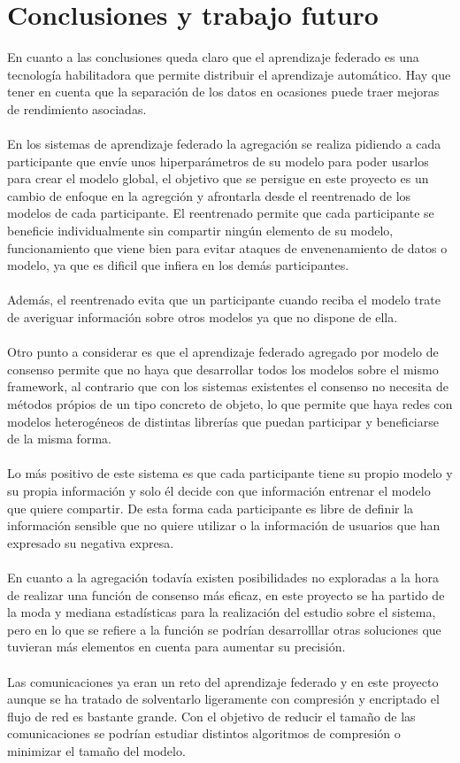 \chapter{Conclusiones y trabajo futuro}
\thispagestyle{fancy}

En cuanto a las conclusiones queda claro que el aprendizaje federado es una tecnología habilitadora que permite distribuir el aprendizaje automático. Hay que tener en cuenta que la separación de los datos en ocasiones puede traer mejoras de rendimiento asociadas.
\\\\
En los sistemas de aprendizaje federado la agregación se realiza pidiendo a cada participante que envíe unos hiperparámetros de su modelo para poder usarlos para crear el modelo global, el objetivo que se persigue en este proyecto es un cambio de enfoque en la agregción y afrontarla desde el reentrenado de los modelos de cada participante. El reentrenado permite que cada participante se beneficie individualmente sin compartir ningún elemento de su modelo, funcionamiento que viene bien para evitar ataques de envenenamiento de datos o modelo, ya que es dificil que infiera en los demás participantes.
\\\\
Además, el reentrenado evita que un participante cuando reciba el modelo trate de averiguar información sobre otros modelos ya que no dispone de ella. 
\\\\
Otro punto a considerar es que el aprendizaje federado agregado por modelo de consenso permite que no haya que desarrollar todos los modelos sobre el mismo framework, al contrario que con los sistemas existentes el consenso no necesita de métodos própios de un tipo concreto de objeto, lo que permite que haya redes con modelos heterogéneos de distintas librerías que puedan participar y beneficiarse de la misma forma.
\\\\
Lo más positivo de este sistema es que cada participante tiene su propio modelo y su propia información y solo él decide con que información entrenar el modelo que quiere compartir. De esta forma cada participante es libre de definir la información sensible que no quiere utilizar o la información de usuarios que han expresado su negativa expresa. 
\\\\
En cuanto a la agregación todavía existen posibilidades no exploradas a la hora de realizar una función de consenso más eficaz, en este proyecto se ha partido de la moda y mediana estadísticas para la realización del estudio sobre el sistema, pero en lo que se refiere a la función se podrían desarrolllar otras soluciones que tuvieran más elementos en cuenta para aumentar su precisión.
\\\\
Las comunicaciones ya eran un reto del aprendizaje federado y en este proyecto aunque se ha tratado de solventarlo ligeramente con compresión y encriptado el flujo de red es bastante grande. Con el objetivo de reducir el tamaño de las comunicaciones se podrían estudiar distintos algoritmos de compresión o minimizar el tamaño del modelo.

